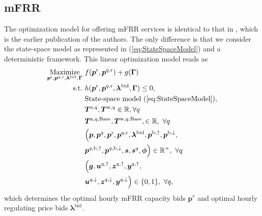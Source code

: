 \documentclass[sigconf]{acmart}
\begin{document}
\subsection{mFRR}

The optimization model for offering mFRR services is identical to that in \cite{gade2023load}, which is the earlier publication of the authors. The only difference is that we consider the state-space model as represented in  (\ref{eq:StateSpaceModel}) and a deterministic framework. This linear optimization model reads as
%
%
\begin{subequations}\label{P1:compact_model_mfrr}
    \begin{align}
        \underset{\bm{p}^{\rm{r}}, \bm{p}^{q,\rm{r}}, \bm{\lambda}^{\rm{bid}}, \bm{\Gamma}}{\text{Maximize}} \  & f(\bm{p}^{\rm{r}}, \bm{p}^{q,\rm{r}}) + g(\bm{\Gamma}) \label{P1:eq1_mfrr}
        \\
        \text{s.t.} \                                                                                           & h(\bm{p}^{\rm{r}}, \bm{p}^{q,\rm{r}}, \bm{\lambda}^{\rm{bid}}, \bm{\Gamma}) \leq 0, \label{P1:eq2_mfrr}                                              \\
        \                                                                                                       & \text{State-space model } (\ref{eq:StateSpaceModel}),  \label{P1:eq3_mfrr}
        \\
        \                                                                                                       & \bm{T}^{\text{z},q}, \bm{T}^{\text{w},q} \in \mathbb{R}, \forall{q} \label{P1:eq4_mfrr}
        \\
        \                                                                                                       & \bm{T}^{\text{z},q,\text{Base}}, \bm{T}^{\text{w},q,\text{Base}}, \in \mathbb{R}, \ \forall{q} \label{P1:eq5_mfrr}
        \\
        \                                                                                                       & \Bigl( \bm{p}, \bm{p}^{q}, \bm{p}^{\rm{r}}, \bm{p}^{q,\rm{r}}, \bm{\lambda}^{\rm{bid}}, \bm{p}^{\rm{b},\uparrow}, \bm{p}^{\rm{b},\downarrow}, \notag \\ & \bm{p}^{q,\rm{b},\uparrow}, \bm{p}^{q,\rm{b},\downarrow}, \bm{s}, \bm{s}^{q}, \bm{\phi} \Bigr) \in \mathbb{R}^{+}, \ \forall{q}  \label{P1:eq6_mfrr}
        \\
        \                                                                                                       & \Bigl( \bm{g}, \bm{u}^{q,\uparrow}, \bm{z}^{q,\uparrow}, \bm{y}^{q,\uparrow}, \notag                                                                 \\ & \bm{u}^{q,\downarrow}, \bm{z}^{q,\downarrow}, \bm{y}^{q,\downarrow} \Bigr) \in \{0,1\}, \ \forall{q}, \label{P1:eq7_mfrr}
    \end{align}
\end{subequations}
\endgroup
which determines the optimal hourly mFRR capacity bids $\bm{p}^{r}$ and optimal hourly regulating price bids $\bm{\lambda}^{\text{bid}}$.
\end{document}
